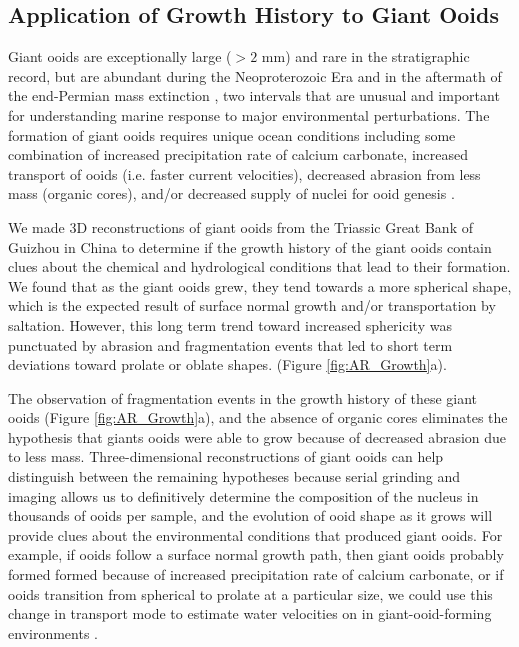 \documentclass[draft]{agujournal2019}
\begin{document}
\subsection{Application of Growth History to Giant Ooids}

Giant ooids are exceptionally large (\(>2\) mm) and rare in the stratigraphic record, but are abundant during the Neoproterozoic Era and in the aftermath of the end-Permian mass extinction \cite{li2013paleoceanographic}, two intervals that are unusual and important for understanding marine response to major environmental perturbations. The formation of giant ooids requires unique ocean conditions including some combination of increased precipitation rate of calcium carbonate, increased transport of ooids (i.e. faster current velocities), decreased abrasion from less mass (organic cores),  and/or decreased supply of nuclei for ooid genesis \cite{sumner1993numerical}. 

We made 3D reconstructions of giant ooids from the Triassic Great Bank of Guizhou in China to determine if the growth history of the giant ooids contain clues about the chemical and hydrological conditions that lead to their formation. We found that as the giant ooids grew, they tend towards a more spherical shape, which is the expected result of surface normal growth and/or transportation by saltation. However, this long term trend toward increased sphericity was punctuated by abrasion and fragmentation events that led to short term deviations toward prolate or oblate shapes. (Figure \ref{fig:AR_Growth}a). 

The observation of fragmentation events in the growth history of these giant ooids (Figure \ref{fig:AR_Growth}a), and the absence of organic cores eliminates the hypothesis that giants ooids were able to grow because of decreased abrasion due to less mass. Three-dimensional reconstructions of giant ooids can help distinguish between the remaining hypotheses because serial grinding and imaging allows us to definitively determine the composition of the nucleus in thousands of ooids per sample, and the evolution of ooid shape as it grows will provide clues about the environmental conditions that produced giant ooids. For example, if ooids follow a surface normal growth path, then giant ooids probably formed formed because of increased precipitation rate of calcium carbonate, or if ooids transition from spherical to prolate at a particular size, we could use this change in transport mode to estimate water velocities on in giant-ooid-forming environments \cite{sipos2018shape}. 
\end{document}
